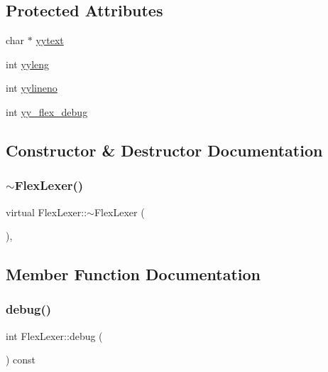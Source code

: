 \subsection*{Protected Attributes}
\begin{DoxyCompactItemize}
\item 
char $\ast$ \hyperlink{classFlexLexer_a31e594872cba4bb896011d3ee1f75f0d}{yytext}
\item 
int \hyperlink{classFlexLexer_a7a483b8c8426cace921d961cd9634c8b}{yyleng}
\item 
int \hyperlink{classFlexLexer_a511f8fed6925478cb9925edce88024c7}{yylineno}
\item 
int \hyperlink{classFlexLexer_afb25c8701977e6f510799f4cf8a4a029}{yy\+\_\+flex\+\_\+debug}
\end{DoxyCompactItemize}


\subsection{Constructor \& Destructor Documentation}
\mbox{\label{classFlexLexer_a513c4982ef52db6d43151becbf3fe05a}} 
\subsubsection{\texorpdfstring{$\sim$\+Flex\+Lexer()}{~FlexLexer()}}
{\footnotesize\ttfamily virtual Flex\+Lexer\+::$\sim$\+Flex\+Lexer (\begin{DoxyParamCaption}{ }\end{DoxyParamCaption})\hspace{0.3cm}{\ttfamily [inline]}, {\ttfamily [virtual]}}



\subsection{Member Function Documentation}
\mbox{\label{classFlexLexer_a71d0a4ad9db57c86b44e84c407eb21f1}} 
\subsubsection{\texorpdfstring{debug()}{debug()}}
{\footnotesize\ttfamily int Flex\+Lexer\+::debug (\begin{DoxyParamCaption}{ }\end{DoxyParamCaption}) const\hspace{0.3cm}{\ttfamily [inline]}}

